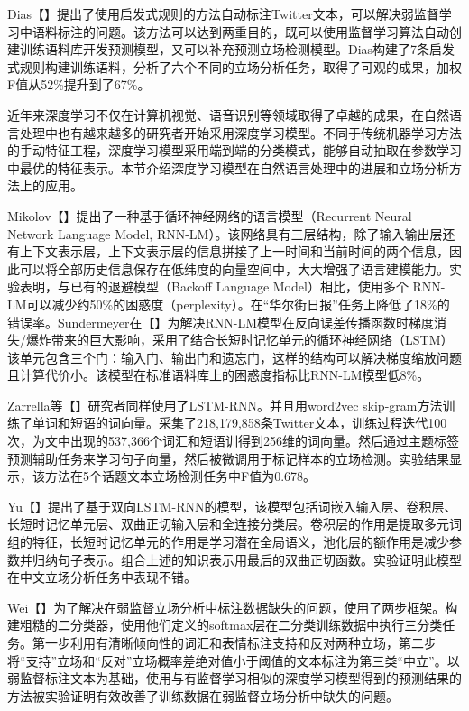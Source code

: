 Dias【】提出了使用启发式规则的方法自动标注Twitter文本，可以解决弱监督学习中语料标注的问题。该方法可以达到两重目的，既可以使用监督学习算法自动创建训练语料库开发预测模型，又可以补充预测立场检测模型。Dias构建了7条启发式规则构建训练语料，分析了六个不同的立场分析任务，取得了可观的成果，加权F值从52\%提升到了67\%。



近年来深度学习不仅在计算机视觉、语音识别等领域取得了卓越的成果，在自然语言处理中也有越来越多的研究者开始采用深度学习模型。不同于传统机器学习方法的手动特征工程，深度学习模型采用端到端的分类模式，能够自动抽取在参数学习中最优的特征表示。本节介绍深度学习模型在自然语言处理中的进展和立场分析方法上的应用。

Mikolov【】提出了一种基于循环神经网络的语言模型（Recurrent Neural Network Language Model, RNN-LM）。该网络具有三层结构，除了输入输出层还有上下文表示层，上下文表示层的信息拼接了上一时间和当前时间的两个信息，因此可以将全部历史信息保存在低纬度的向量空间中，大大增强了语言建模能力。实验表明，与已有的退避模型（Backoff Language Model）相比，使用多个 RNN-LM可以减少约50\%的困惑度（perplexity）。在“华尔街日报”任务上降低了18\%的错误率。Sundermeyer在【】为解决RNN-LM模型在反向误差传播函数时梯度消失/爆炸带来的巨大影响，采用了结合长短时记忆单元的循环神经网络（LSTM）该单元包含三个门：输入门、输出门和遗忘门，这样的结构可以解决梯度缩放问题且计算代价小。该模型在标准语料库上的困惑度指标比RNN-LM模型低8\%。

Zarrella等【】研究者同样使用了LSTM-RNN。并且用word2vec skip-gram方法训练了单词和短语的词向量。采集了218,179,858条Twitter文本，训练过程迭代100次，为文中出现的537,366个词汇和短语训得到256维的词向量。然后通过主题标签预测辅助任务来学习句子向量，然后被微调用于标记样本的立场检测。实验结果显示，该方法在5个话题文本立场检测任务中F值为0.678。

Yu【】提出了基于双向LSTM-RNN的模型，该模型包括词嵌入输入层、卷积层、长短时记忆单元层、双曲正切输入层和全连接分类层。卷积层的作用是提取多元词组的特征，长短时记忆单元的作用是学习潜在全局语义，池化层的额作用是减少参数并归纳句子表示。组合上述的知识表示用最后的双曲正切函数。实验证明此模型在中文立场分析任务中表现不错。

Wei【】为了解决在弱监督立场分析中标注数据缺失的问题，使用了两步框架。构建粗糙的二分类器，使用他们定义的softmax层在二分类训练数据中执行三分类任务。第一步利用有清晰倾向性的词汇和表情标注支持和反对两种立场，第二步将“支持”立场和“反对”立场概率差绝对值小于阈值的文本标注为第三类“中立”。以弱监督标注文本为基础，使用与有监督学习相似的深度学习模型得到的预测结果的方法被实验证明有效改善了训练数据在弱监督立场分析中缺失的问题。

